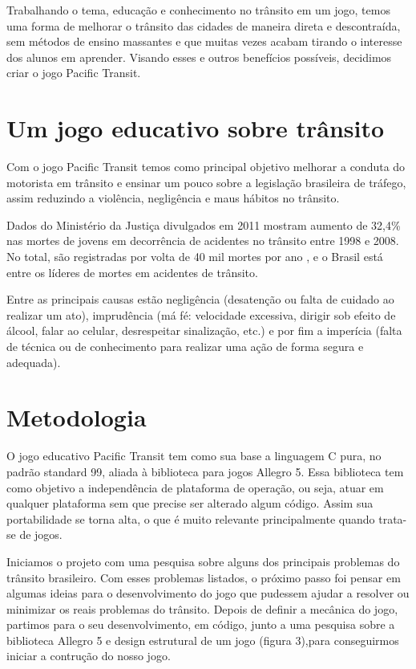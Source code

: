 \documentclass[
	article,			%
	11pt,				%
	oneside,			%
	a4paper,			%
	english,			%
	brazil,				%
	]{abntex2}
\begin{document}
Trabalhando o tema, educação e conhecimento no trânsito em um jogo, temos uma forma de melhorar  
o trânsito das cidades de maneira direta e descontraída, sem métodos de ensino massantes e
que muitas vezes acabam tirando o interesse dos alunos em aprender.
Visando esses e outros benefícios possíveis, decidimos criar o jogo Pacific Transit.\\

\section{Um jogo educativo sobre trânsito}

Com o jogo Pacific Transit temos como principal objetivo melhorar a conduta do motorista 
em trânsito e ensinar um pouco sobre a legislação brasileira de tráfego, assim reduzindo a 
violência, negligência  e maus hábitos no trânsito. 

Dados do Ministério da Justiça divulgados
em 2011 mostram aumento de 32,4\% nas
mortes de jovens em decorrência de acidentes
no trânsito entre 1998 e 2008. No total, são
registradas por volta de 40 mil mortes por ano , e o Brasil está 
entre os líderes de mortes em acidentes de trânsito.

Entre as principais causas estão negligência (desatenção ou falta de cuidado ao realizar um ato), 
imprudência (má fé: velocidade excessiva, dirigir sob efeito de álcool, falar ao celular, desrespeitar sinalização, etc.) e por fim a 
imperícia (falta de técnica ou de conhecimento para realizar uma ação de forma segura e adequada).

\section{Metodologia}

O jogo educativo Pacific Transit tem como sua base a linguagem C pura, no padrão standard 99, 
aliada à biblioteca para jogos Allegro 5.
Essa biblioteca tem como objetivo a independência de plataforma de operação, ou seja, 
atuar em qualquer plataforma sem que precise ser alterado algum código. Assim sua portabilidade se torna alta,
o que é muito relevante principalmente quando trata-se de jogos.

Iniciamos o projeto com uma pesquisa sobre alguns dos principais problemas do trânsito brasileiro.
Com esses problemas listados, o próximo passo foi pensar em algumas ideias para o desenvolvimento do 
jogo que pudessem ajudar a resolver ou minimizar os reais problemas do trânsito.
Depois de definir a mecânica do jogo, partimos para o seu  desenvolvimento, em código, junto a uma pesquisa sobre a biblioteca 
Allegro 5 e design estrutural de um jogo (figura 3),para conseguirmos iniciar
a contrução do nosso jogo.
\end{document}
